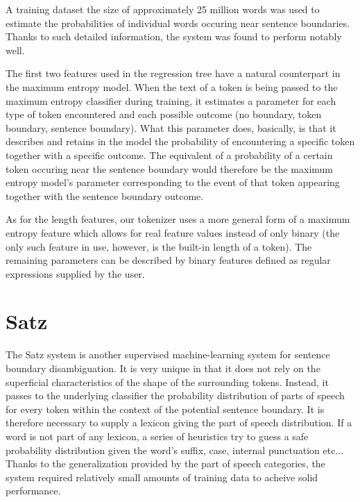 A training dataset the size of approximately 25 million words was used to
estimate the probabilities of individual words occuring near sentence
boundaries. Thanks to such detailed information, the system was found to
perform notably well.

The first two features used in the regression tree have a natural counterpart
in the maximum entropy model. When the text of a token is being passed to the
maximum entropy classifier during training, it estimates a parameter for each
type of token encountered and each possible outcome (no boundary, token
boundary, sentence boundary). What this parameter does, basically, is that it
describes and retains in the model the probability of encountering a specific
token together with a specific outcome. The equivalent of a probability of a
certain token occuring near the sentence boundary would therefore be the
maximum entropy model's parameter corresponding to the event of that token
appearing together with the sentence boundary outcome.

As for the length features, our tokenizer uses a more general form of a maximum
entropy feature which allows for real feature values instead of only binary
(the only such feature in use, however, is the built-in length of a token).
The remaining parameters can be described by binary features defined as regular
expressions supplied by the user.

\section{Satz}
\label{sec:survey-satz}

The Satz system is another supervised machine-learning system for sentence
boundary disambiguation. It is very unique in that it does not rely on the
superficial characteristics of the shape of the surrounding tokens. Instead, it
passes to the underlying classifier the probability distribution of parts of
speech for every token within the context of the potential sentence boundary.
It is therefore necessary to supply a lexicon giving the part of speech
distribution. If a word is not part of any lexicon, a series of heuristics try
to guess a safe probability distribution given the word's suffix, case,
internal punctuation etc... Thanks to the generalization provided by the part
of speech categories, the system required relatively small amounts of training
data to acheive solid performance.

